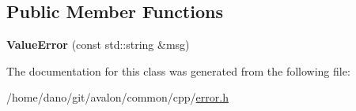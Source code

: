 \subsection*{Public Member Functions}
\begin{DoxyCompactItemize}
\item 
\mbox{\label{classtcf_1_1error_1_1ValueError_ac78aae7d00f6fdcf2915b61ce40ad956}} 
{\bfseries Value\+Error} (const std\+::string \&msg)
\end{DoxyCompactItemize}


The documentation for this class was generated from the following file\+:\begin{DoxyCompactItemize}
\item 
/home/dano/git/avalon/common/cpp/\hyperlink{error_8h}{error.\+h}\end{DoxyCompactItemize}
